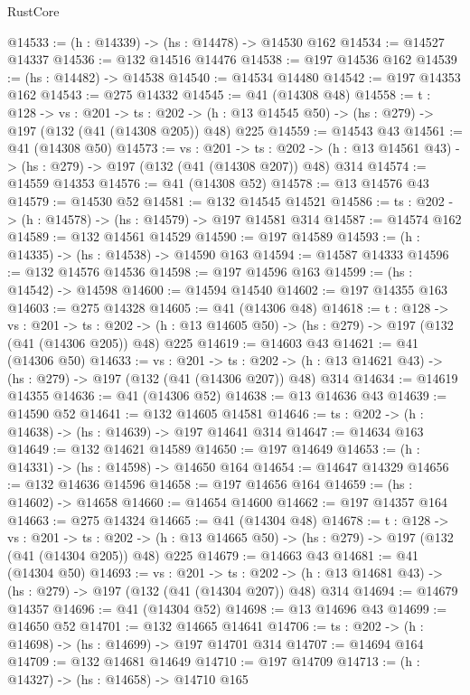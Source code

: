 \begin{lexlean}{RustCore}
\begin{coremodule}
@14533 := (h : @14339) -> (hs : @14478) -> @14530 @162
@14534 := @14527 @14337
@14536 := @132 @14516 @14476
@14538 := @197 @14536 @162
@14539 := (hs : @14482) -> @14538
@14540 := @14534 @14480
@14542 := @197 @14353 @162
@14543 := @275 @14332
@14545 := @41 (@14308 @48)
@14558 := {t : @128} ->
  {vs : @201} ->
  {ts : @202} -> (h : @13 @14545 @50) -> (hs : @279) -> @197 (@132 (@41 (@14308 @205)) @48) @225
@14559 := @14543 @43
@14561 := @41 (@14308 @50)
@14573 := {vs : @201} ->
  {ts : @202} -> (h : @13 @14561 @43) -> (hs : @279) -> @197 (@132 (@41 (@14308 @207)) @48) @314
@14574 := @14559 @14353
@14576 := @41 (@14308 @52)
@14578 := @13 @14576 @43
@14579 := @14530 @52
@14581 := @132 @14545 @14521
@14586 := {ts : @202} -> (h : @14578) -> (hs : @14579) -> @197 @14581 @314
@14587 := @14574 @162
@14589 := @132 @14561 @14529
@14590 := @197 @14589
@14593 := (h : @14335) -> (hs : @14538) -> @14590 @163
@14594 := @14587 @14333
@14596 := @132 @14576 @14536
@14598 := @197 @14596 @163
@14599 := (hs : @14542) -> @14598
@14600 := @14594 @14540
@14602 := @197 @14355 @163
@14603 := @275 @14328
@14605 := @41 (@14306 @48)
@14618 := {t : @128} ->
  {vs : @201} ->
  {ts : @202} -> (h : @13 @14605 @50) -> (hs : @279) -> @197 (@132 (@41 (@14306 @205)) @48) @225
@14619 := @14603 @43
@14621 := @41 (@14306 @50)
@14633 := {vs : @201} ->
  {ts : @202} -> (h : @13 @14621 @43) -> (hs : @279) -> @197 (@132 (@41 (@14306 @207)) @48) @314
@14634 := @14619 @14355
@14636 := @41 (@14306 @52)
@14638 := @13 @14636 @43
@14639 := @14590 @52
@14641 := @132 @14605 @14581
@14646 := {ts : @202} -> (h : @14638) -> (hs : @14639) -> @197 @14641 @314
@14647 := @14634 @163
@14649 := @132 @14621 @14589
@14650 := @197 @14649
@14653 := (h : @14331) -> (hs : @14598) -> @14650 @164
@14654 := @14647 @14329
@14656 := @132 @14636 @14596
@14658 := @197 @14656 @164
@14659 := (hs : @14602) -> @14658
@14660 := @14654 @14600
@14662 := @197 @14357 @164
@14663 := @275 @14324
@14665 := @41 (@14304 @48)
@14678 := {t : @128} ->
  {vs : @201} ->
  {ts : @202} -> (h : @13 @14665 @50) -> (hs : @279) -> @197 (@132 (@41 (@14304 @205)) @48) @225
@14679 := @14663 @43
@14681 := @41 (@14304 @50)
@14693 := {vs : @201} ->
  {ts : @202} -> (h : @13 @14681 @43) -> (hs : @279) -> @197 (@132 (@41 (@14304 @207)) @48) @314
@14694 := @14679 @14357
@14696 := @41 (@14304 @52)
@14698 := @13 @14696 @43
@14699 := @14650 @52
@14701 := @132 @14665 @14641
@14706 := {ts : @202} -> (h : @14698) -> (hs : @14699) -> @197 @14701 @314
@14707 := @14694 @164
@14709 := @132 @14681 @14649
@14710 := @197 @14709
@14713 := (h : @14327) -> (hs : @14658) -> @14710 @165

\end{coremodule}
\end{lexlean}
